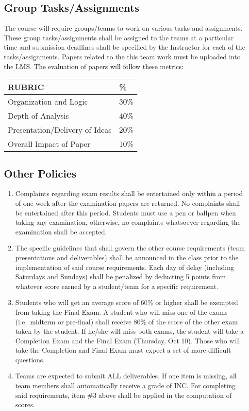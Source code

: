 \hypertarget{group-tasksassignments}{%
\subsection{Group Tasks/Assignments}\label{group-tasksassignments}}

The course will require groups/teams to work on various tasks and
assignments. These group tasks/assignments shall be assigned to the
teams at a particular time and submission deadlines shall be specified
by the Instructor for each of the tasks/assignments. Papers related to
the this team work must be uploaded into the LMS. The evaluation of
papers will follow these metrics:

\begin{longtable}[]{@{}ll@{}}
\toprule
RUBRIC & \%\tabularnewline
\midrule
\endhead
Organization and Logic & 30\%\tabularnewline
Depth of Analysis & 40\%\tabularnewline
Presentation/Delivery of Ideas & 20\%\tabularnewline
Overall Impact of Paper & 10\%\tabularnewline
\bottomrule
\end{longtable}

\hypertarget{other-policies}{%
\subsection{Other Policies}\label{other-policies}}

\begin{enumerate}
\def\labelenumi{\arabic{enumi}.}
\tightlist
\item
  Complaints regarding exam results shall be entertained only within a
  period of one week after the examination papers are returned. No
  complaints shall be entertained after this period. Students must use a
  pen or ballpen when taking any examination, otherwise, no complaints
  whatsoever regarding the examination shall be accepted.
\item
  The specific guidelines that shall govern the other course
  requirements (team presentations and deliverables) shall be announced
  in the class prior to the implementation of said course requirements.
  Each day of delay (including Saturdays and Sundays) shall be penalized
  by deducting 5 points from whatever score earned by a student/team for
  a specific requirement.
\item
  Students who will get an average score of 60\% or higher shall be
  exempted from taking the Final Exam. A student who will miss one of
  the exams (i.e.~midterm or pre-final) shall receive 80\% of the score
  of the other exam taken by the student. If he/she will miss both
  exams, the student will take a Completion Exam and the Final Exam
  (Thursday, Oct 10). Those who will take the Completion and Final Exam
  must expect a set of more difficult questions.
\item
  Teams are expected to submit ALL deliverables. If one item is missing,
  all team members shall automatically receive a grade of INC. For
  completing said requirements, item \#3 above shall be applied in the
  computation of scores.
\end{enumerate}

